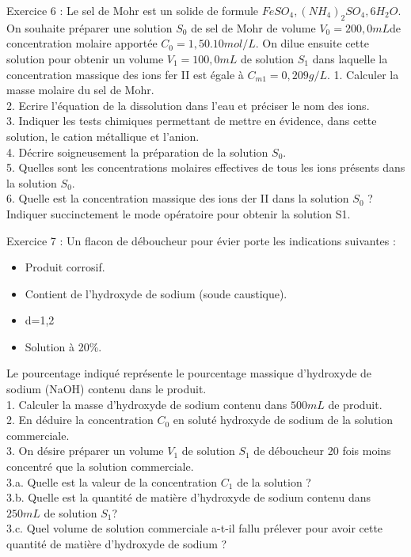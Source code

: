 \documentclass[12pt, french]{article}
\begin{document}

\begin{Box2}{Exercice 6 :}
Le sel de Mohr est un solide de formule $FeSO_4, (NH_4)_2SO_4, 6H_2O$. On souhaite préparer une solution $S_0$ de sel de Mohr de volume $V_0=200,0 mL$de concentration molaire apportée $C_0 = 1,50 . 10 mol / L.$
On dilue ensuite cette solution pour obtenir un volume $V_1 = 100,0 mL$ de solution $S_1$ dans laquelle la
   concentration massique des ions fer II est égale à $C_{m1}=0,209 g / L.$
1. Calculer la masse molaire du sel de Mohr.\\
2. Ecrire l’équation de la dissolution dans l’eau et préciser le nom des ions.\\
3. Indiquer les tests chimiques permettant de mettre en évidence, dans cette solution, le cation métallique et
l’anion.\\
4. Décrire soigneusement la préparation de la solution $S_0$.\\
5. Quelles sont les concentrations molaires effectives de tous les ions présents dans la solution $S_0$.\\
   6. Quelle est la concentration massique des ions der II dans la solution $S_0$ ? Indiquer succinctement le mode
opératoire pour obtenir la solution S1.

\end{Box2}



\begin{Box2}{Exercice 7 : }
Un flacon de déboucheur pour évier porte les indications suivantes :
   \begin{itemize}
      \item Produit corrosif.
      \item Contient de l’hydroxyde de sodium (soude caustique).
      \item d=1,2
      \item Solution à 20\%.
   \end{itemize}
Le pourcentage indiqué représente le pourcentage massique d’hydroxyde de sodium (NaOH) contenu dans
le produit.\\
1. Calculer la masse d’hydroxyde de sodium contenu dans $500 mL$ de produit.\\
2. En déduire la concentration $C_0$ en soluté hydroxyde de sodium de la solution commerciale.\\
3. On désire préparer un volume $V_1$ de solution $S_1$ de déboucheur 20 fois moins concentré que la solution commerciale.\\
3.a. Quelle est la valeur de la concentration $C_1$ de la solution ?\\
3.b. Quelle est la quantité de matière d’hydroxyde de sodium contenu dans $250 mL$ de solution $S_1$?\\
3.c. Quel volume de solution commerciale a-t-il fallu prélever pour avoir cette quantité de matière
d’hydroxyde de sodium ?\\
\end{Box2}

\end{document}
